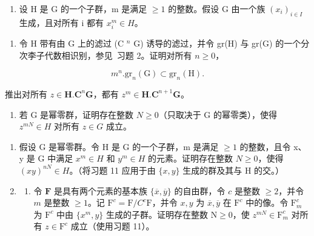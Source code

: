 \begin{enumerate}
\def\labelenumi{\arabic{enumi}.}
\setcounter{enumi}{10}
\tightlist
\item
  设 H 是 G 的一个子群，m 是满足 \(\geqslant 1\) 的整数。假设 G 由一个族 \((x_{i})_{i\in I}\) 生成，且对所有 i 都有 \(x_{i}^{m}\in H\)。
\end{enumerate}

\begin{enumerate}
\def\labelenumi{(\alph{enumi})}
\tightlist
\item
  令 H 带有由 G 上的滤过 (C \(^{n}\) G) 诱导的滤过，并令 gr(H) 与 gr(G) 的一个分次李子代数相识别，参见~习题 2。证明对所有 \(n \geqslant 0\)，
\end{enumerate}

\[
m ^ {n}. \mathrm{gr} _ {n} (\mathrm{G}) \subset \mathrm{gr} _ {n} (\mathrm{H}).
\]

推出对所有 \(z \in \mathbf{H}.\mathbf{C}^n\mathbf{G}\)，都有 \(z^m \in \mathbf{H}.\mathbf{C}^{n+1}\mathbf{G}\)。

\begin{enumerate}
\def\labelenumi{(\alph{enumi})}
\setcounter{enumi}{1}
\tightlist
\item
  若 G 是幂零群，证明存在整数 \(N \geqslant 0\)（只取决于 G 的幂零类），使得 \(z^{mN} \in H\) 对所有 \(z \in G\) 成立。
\end{enumerate}

\begin{enumerate}
\def\labelenumi{\arabic{enumi}.}
\setcounter{enumi}{11}
\item
  假设 G 是幂零群。令 H 是 G 的一个子群，m 是满足 \(\geqslant 1\) 的整数，且令 x、y 是 G 中满足 \(x^{m} \in H\) 和 \(y^{m} \in H\) 的元素。证明存在整数 \(N \geqslant 0\)，使得 \((xy)^{nN} \in H\)。（将习题 11 应用于由 \(\{x, y\}\) 生成的群及其与 H 的交。）
\item
  \begin{enumerate}
  \def\labelenumii{(\alph{enumii})}
  \tightlist
  \item
    令 \(\mathbf{F}\) 是具有两个元素的基本族 \(\{\overline{x},\overline{y}\}\) 的自由群，令 \(c\) 是整数 \(\geqslant 2\)，并令 \(m\) 是整数 \(\geqslant 1\)。记 \(\mathrm{F}^c = \mathrm{F} / C^c\mathrm{F}\)，并令 \(x,y\) 为 \(\overline{x},\overline{y}\) 在 \(\mathrm{F}^c\) 中的像。令 \(\mathrm{F}_m^c\) 为 \(\mathrm{F}^c\) 中由 \(\{x^{m},y\}\) 生成的子群。证明存在整数 \(\mathrm{N}\geqslant 0\)，使 \(z^{mN}\in \mathrm{F}_{m}^{c}\) 对所有 \(z\in \mathrm{F}^c\) 成立（使用习题 11）。
  \end{enumerate}
\end{enumerate}

